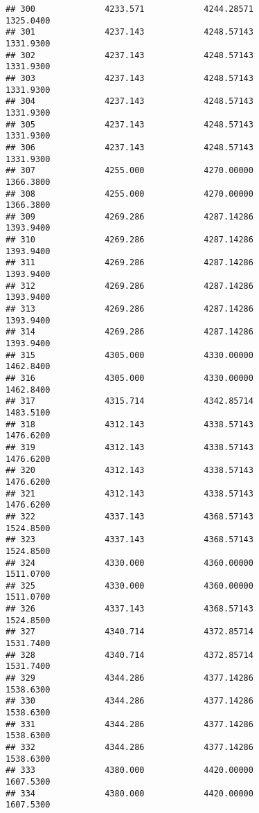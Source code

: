 \documentclass[]{article}
\begin{document}
\begin{verbatim}
## 300              4233.571            4244.28571                1325.0400
## 301              4237.143            4248.57143                1331.9300
## 302              4237.143            4248.57143                1331.9300
## 303              4237.143            4248.57143                1331.9300
## 304              4237.143            4248.57143                1331.9300
## 305              4237.143            4248.57143                1331.9300
## 306              4237.143            4248.57143                1331.9300
## 307              4255.000            4270.00000                1366.3800
## 308              4255.000            4270.00000                1366.3800
## 309              4269.286            4287.14286                1393.9400
## 310              4269.286            4287.14286                1393.9400
## 311              4269.286            4287.14286                1393.9400
## 312              4269.286            4287.14286                1393.9400
## 313              4269.286            4287.14286                1393.9400
## 314              4269.286            4287.14286                1393.9400
## 315              4305.000            4330.00000                1462.8400
## 316              4305.000            4330.00000                1462.8400
## 317              4315.714            4342.85714                1483.5100
## 318              4312.143            4338.57143                1476.6200
## 319              4312.143            4338.57143                1476.6200
## 320              4312.143            4338.57143                1476.6200
## 321              4312.143            4338.57143                1476.6200
## 322              4337.143            4368.57143                1524.8500
## 323              4337.143            4368.57143                1524.8500
## 324              4330.000            4360.00000                1511.0700
## 325              4330.000            4360.00000                1511.0700
## 326              4337.143            4368.57143                1524.8500
## 327              4340.714            4372.85714                1531.7400
## 328              4340.714            4372.85714                1531.7400
## 329              4344.286            4377.14286                1538.6300
## 330              4344.286            4377.14286                1538.6300
## 331              4344.286            4377.14286                1538.6300
## 332              4344.286            4377.14286                1538.6300
## 333              4380.000            4420.00000                1607.5300
## 334              4380.000            4420.00000                1607.5300

\end{verbatim}
\end{document}
